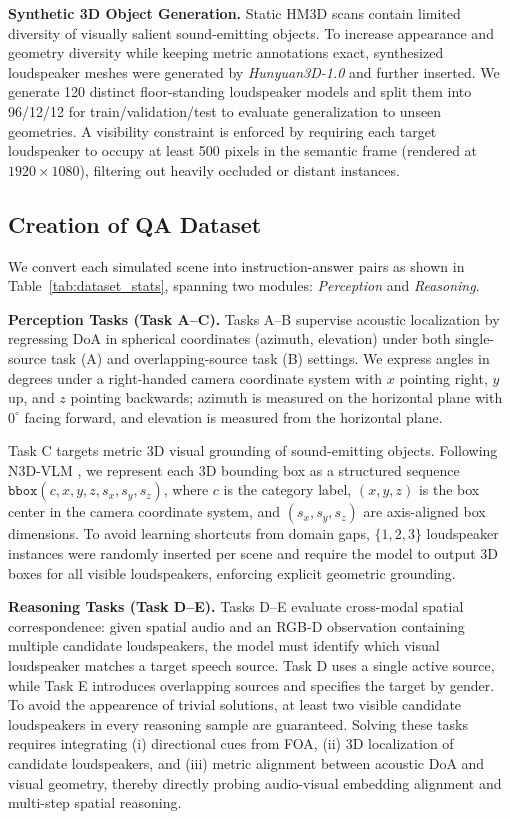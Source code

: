 \textbf{Synthetic 3D Object Generation.} 
Static HM3D scans contain limited diversity of visually salient sound-emitting objects. 
To increase appearance and geometry diversity while keeping metric annotations exact, synthesized loudspeaker meshes were generated by \textit{Hunyuan3D-1.0} \cite{yang2024hunyuan3d} and further inserted. 
We generate 120 distinct floor-standing loudspeaker models and split them into 96/12/12 for train/validation/test to evaluate generalization to unseen geometries. 
A visibility constraint is enforced by requiring each target loudspeaker to occupy at least 500 pixels in the semantic frame (rendered at $1920 \times 1080$), filtering out heavily occluded or distant instances.

\subsection{Creation of QA Dataset}

We convert each simulated scene into instruction-answer pairs as shown in Table~\ref{tab:dataset_stats}, spanning two modules: \textit{Perception} and \textit{Reasoning}.

\textbf{Perception Tasks (Task A--C).}
Tasks A--B supervise acoustic localization by regressing DoA in spherical coordinates (azimuth, elevation) under both single-source task (A) and overlapping-source task (B) settings.
We express angles in degrees under a right-handed camera coordinate system with $x$ pointing right, $y$ up, and $z$ pointing backwards; azimuth is measured on the horizontal plane with $0^\circ$ facing forward, and elevation is measured from the horizontal plane.

Task C targets metric 3D visual grounding of sound-emitting objects. 
Following N3D-VLM \cite{wang2025n3d}, we represent each 3D bounding box as a structured sequence $\texttt{bbox}(c, x, y, z, s_x, s_y, s_z)$, where $c$ is the category label, $(x,y,z)$ is the box center in the camera coordinate system, and $(s_x,s_y,s_z)$ are axis-aligned box dimensions. 
To avoid learning shortcuts from domain gaps, $\{1,2,3\}$ loudspeaker instances were randomly inserted per scene and require the model to output 3D boxes for all visible loudspeakers, enforcing explicit geometric grounding.

\textbf{Reasoning Tasks (Task D--E).}
Tasks D--E evaluate cross-modal spatial correspondence: given spatial audio and an RGB-D observation containing multiple candidate loudspeakers, the model must identify which visual loudspeaker matches a target speech source. 
Task D uses a single active source, while Task E introduces overlapping sources and specifies the target by gender. 
To avoid the appearence of trivial solutions, at least two visible candidate loudspeakers in every reasoning sample are guaranteed. 
Solving these tasks requires integrating (i) directional cues from FOA, (ii) 3D localization of candidate loudspeakers, and (iii) metric alignment between acoustic DoA and visual geometry, thereby directly probing audio-visual embedding alignment and multi-step spatial reasoning.
